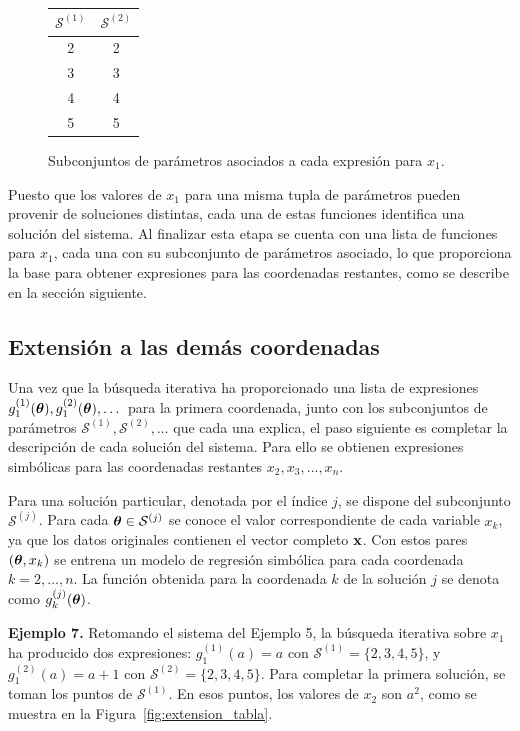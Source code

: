 \begin{figure}[H]
\centering
\begin{tabular}{c|c}
\(\mathcal{S}^{(1)}\) & \(\mathcal{S}^{(2)}\) \\
\hline 2 & 2 \\
3 & 3 \\
4 & 4 \\
5 & 5
\end{tabular}
\caption{Subconjuntos de parámetros asociados a cada expresión para \(x_1\).} \label{fig:subconjuntos_ejemplo6}
\end{figure}

Puesto que los valores de \(x_1\) para una misma tupla de parámetros pueden provenir de soluciones distintas, cada una de estas funciones identifica una solución del sistema. Al finalizar esta etapa se cuenta con una lista de funciones para \(x_1\), cada una con su subconjunto de parámetros asociado, lo que proporciona la base para obtener expresiones para las coordenadas restantes, como se describe en la sección siguiente.

\subsection{Extensión a las demás coordenadas}
\label{sec:extension_coordenadas}

Una vez que la búsqueda iterativa ha proporcionado una lista de expresiones \(g_1^{(1)}(\boldsymbol{\theta}), g_1^{(2)}(\boldsymbol{\theta}), \dots\) para la primera coordenada, junto con los subconjuntos de parámetros
\(\mathcal{S}^{(1)}, \mathcal{S}^{(2)}, \dots\) que cada una explica,
el paso siguiente es completar la descripción de cada solución del sistema. Para ello se obtienen expresiones simbólicas para las coordenadas restantes \(x_2, x_3, \dots, x_n\).

Para una solución particular, denotada por el índice \(j\), se dispone del subconjunto \(\mathcal{S}^{(j)}\). Para cada
\(\boldsymbol{\theta} \in \mathcal{S}^{(j)}\) se conoce el valor correspondiente
de cada variable \(x_k\), ya que los datos originales contienen el vector completo \(\mathbf{x}\). Con estos pares \((\boldsymbol{\theta}, x_k)\) se entrena un modelo de regresión simbólica para cada coordenada
\(k = 2, \dots, n\). La función obtenida para la coordenada \(k\) de
la solución \(j\) se denota como \(g_k^{(j)}(\boldsymbol{\theta})\).

\bigskip \noindent\textbf{Ejemplo 7.} Retomando el sistema del Ejemplo 5, la búsqueda iterativa sobre \(x_1\) ha producido dos expresiones:
\(g_1^{(1)}(a) = a\) con \(\mathcal{S}^{(1)} = \{2, 3, 4, 5\}\), y
\(g_1^{(2)}(a) = a + 1\) con \(\mathcal{S}^{(2)} = \{2, 3, 4, 5\}\).
Para completar la primera solución, se toman los puntos de
\(\mathcal{S}^{(1)}\). En esos puntos, los valores de \(x_2\) son
\(a^2\), como se muestra en la Figura~\ref{fig:extension_tabla}.

